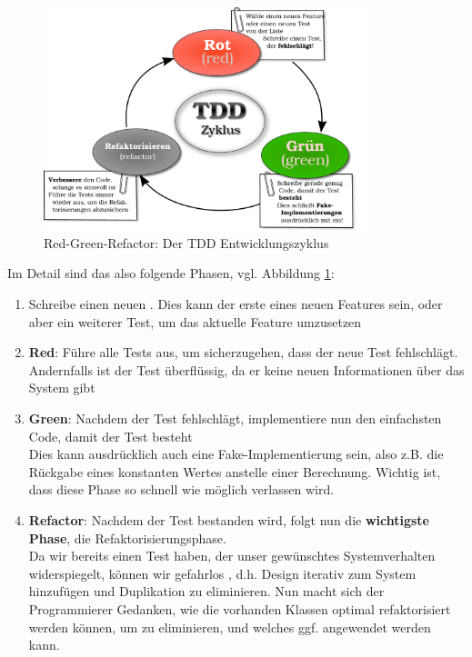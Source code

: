   \begin{figure}[htbp]
 \centering
 \includegraphics[width=0.85\textwidth]{./diagrams/red-green-refactor.pdf}
 \caption{Red-Green-Refactor: Der TDD Entwicklungszyklus}
  \label{fig:redgreenrefactor}
\end{figure}
  Im Detail sind das also folgende Phasen, vgl. Abbildung \ref{fig:redgreenrefactor}:
  \begin{enumerate}
   \item Schreibe einen neuen . Dies kann der erste eines neuen Features sein, oder aber ein weiterer Test, um das aktuelle Feature umzusetzen
   \item \textbf{Red}: Führe alle Tests aus, um sicherzugehen, dass der neue Test fehlschlägt. Andernfalls ist der Test überflüssig, da er keine neuen Informationen über das System gibt
   \item \textbf{Green}: Nachdem der Test fehlschlägt, implementiere nun den einfachsten Code, damit der Test besteht\\
   Dies kann ausdrücklich auch eine Fake-Implementierung sein, also z.B. die Rückgabe eines konstanten Wertes anstelle einer Berechnung. Wichtig ist, dass diese Phase so schnell wie möglich verlassen wird.
   \item \textbf{Refactor}: Nachdem der Test bestanden wird, folgt nun die \textbf{wichtigste Phase}, die Refaktorisierungsphase.\\
   Da wir bereits einen Test haben, der unser gewünschtes Systemverhalten widerspiegelt, können wir gefahrlos , d.h. Design iterativ zum System hinzufügen und Duplikation zu eliminieren. Nun macht sich der Programmierer Gedanken, wie die vorhanden Klassen optimal refaktorisiert werden können, um  zu eliminieren, und welches  ggf. angewendet werden kann.
  \end{enumerate}


